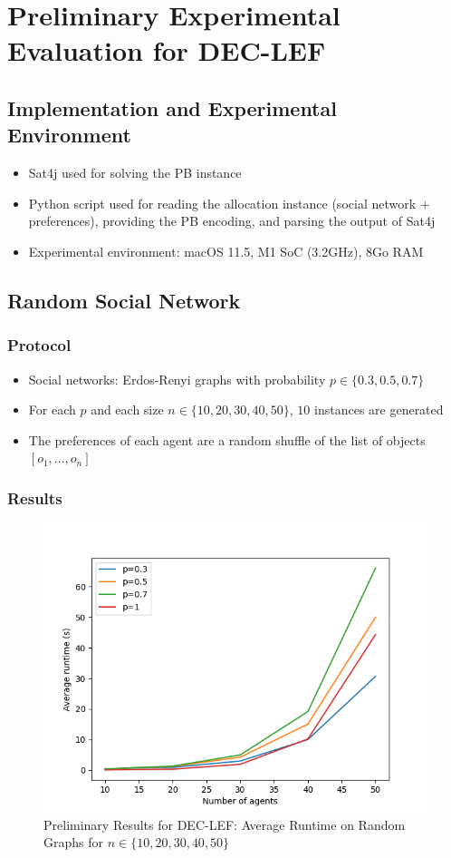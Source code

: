 \documentclass{article}
\begin{document}
\appendix

\section{Preliminary Experimental Evaluation for DEC-LEF}\label{section:prelim-expe-dec-lef}
\subsection{Implementation and Experimental Environment}
\begin{itemize}
	\item Sat4j \cite{BerreP10} used for solving the PB instance
	\item Python script used for reading the allocation instance (social network $+$ preferences), providing the PB encoding, and parsing the output of Sat4j
	\item Experimental environment: macOS 11.5, M1 SoC (3.2GHz), 8Go RAM
\end{itemize}

\subsection{Random Social Network}
\subsubsection{Protocol}
\begin{itemize}
	\item Social networks: Erdos-Renyi graphs with probability $p \in \{0.3, 0.5, 0.7\}$
	\item For each $p$ and each size $n \in \{10,20,30,40,50\}$, $10$ instances are generated
	\item The preferences of each agent are a random shuffle of the list of objects $[o_1,\dots,o_n]$
\end{itemize}

\subsubsection{Results}
\begin{figure}[htb]
\centering
\includegraphics[width=0.5\linewidth]{prelim-random-results.png}
\caption{Preliminary Results for DEC-LEF: Average Runtime on Random Graphs for $n \in \{10,20,30,40,50\}$}
\end{figure}
\end{document}
